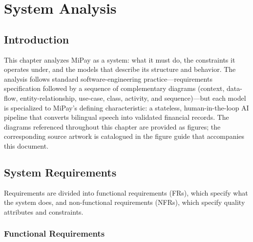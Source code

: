 \chapter{System Analysis}

\setlength{\parindent}{1em}

\section{Introduction}

This chapter analyzes MiPay as a system: what it must do, the constraints it
operates under, and the models that describe its structure and behavior. The
analysis follows standard software-engineering practice---requirements
specification followed by a sequence of complementary diagrams (context,
data-flow, entity-relationship, use-case, class, activity, and sequence)---but
each model is specialized to MiPay's defining characteristic: a stateless,
human-in-the-loop AI pipeline that converts bilingual speech into validated
financial records. The diagrams referenced throughout this chapter are provided
as figures; the corresponding source artwork is catalogued in the figure guide
that accompanies this document.

\section{System Requirements}

Requirements are divided into functional requirements (FRs), which specify what
the system does, and non-functional requirements (NFRs), which specify quality
attributes and constraints.

\subsection{Functional Requirements}

